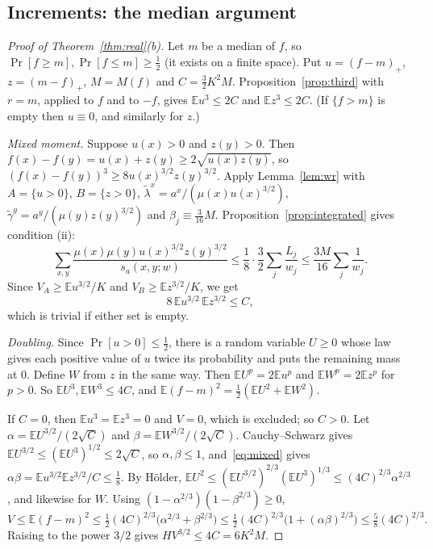 \documentclass[11pt]{article}
\numberwithin{equation}{section}
\theoremstyle{definition}
\theoremstyle{remark}
\newcommand{\E}{\mathbb{E}}
\newcommand{\1}{\mathbf 1}
\begin{document}
\subsection{Increments: the median argument}
\begin{proof}[Proof of Theorem~\ref{thm:real}(b)]
Let $m$ be a median of $f$, so $\Pr[f\ge m],\Pr[f\le m]\ge\frac12$ (it exists on a finite space). Put $u=(f-m)_+$, $z=(m-f)_+$, $M=M(f)$ and $C=\frac32K^2M$. Proposition~\ref{prop:third} with $r=m$, applied to $f$ and to $-f$, gives $\E u^3\le2C$ and $\E z^3\le2C$. (If $\{f>m\}$ is empty then $u\equiv0$, and similarly for $z$.)

\emph{Mixed moment.} Suppose $u(x)>0$ and $z(y)>0$. Then $f(x)-f(y)=u(x)+z(y)\ge2\sqrt{u(x)z(y)}$, so $(f(x)-f(y))^3\ge8u(x)^{3/2}z(y)^{3/2}$. Apply Lemma~\ref{lem:wr} with $A=\{u>0\}$, $B=\{z>0\}$, $\tilde\lambda^x=a^x/(\mu(x)u(x)^{3/2})$, $\tilde\gamma^y=a^y/(\mu(y)z(y)^{3/2})$ and $\beta_j\equiv\frac3{16}M$. Proposition~\ref{prop:integrated} gives condition (ii):
\[
\sum_{x,y}\frac{\mu(x)\mu(y)u(x)^{3/2}z(y)^{3/2}}{s_a(x,y;w)}\le\frac18\cdot\frac32\sum_j\frac{L_j}{w_j}\le\frac{3M}{16}\sum_j\frac1{w_j}.
\]
Since $V_A\ge\E u^{3/2}/K$ and $V_B\ge\E z^{3/2}/K$, we get
\begin{equation}\label{eq:mixed}
8\,\E u^{3/2}\,\E z^{3/2}\le C,
\end{equation}
which is trivial if either set is empty.

\emph{Doubling.} Since $\Pr[u>0]\le\frac12$, there is a random variable $U\ge0$ whose law gives each positive value of $u$ twice its probability and puts the remaining mass at $0$. Define $W$ from $z$ in the same way. Then $\E U^p=2\E u^p$ and $\E W^p=2\E z^p$ for $p>0$. So $\E U^3,\E W^3\le4C$, and $\E(f-m)^2=\frac12(\E U^2+\E W^2)$.

If $C=0$, then $\E u^3=\E z^3=0$ and $V=0$, which is excluded; so $C>0$. Let $\alpha=\E U^{3/2}/(2\sqrt C)$ and $\beta=\E W^{3/2}/(2\sqrt C)$. Cauchy--Schwarz gives $\E U^{3/2}\le(\E U^3)^{1/2}\le2\sqrt C$, so $\alpha,\beta\le1$, and~\eqref{eq:mixed} gives $\alpha\beta=\E u^{3/2}\E z^{3/2}/C\le\frac18$. By H\"older, $\E U^2\le(\E U^{3/2})^{2/3}(\E U^3)^{1/3}\le(4C)^{2/3}\alpha^{2/3}$, and likewise for $W$. Using $(1-\alpha^{2/3})(1-\beta^{2/3})\ge0$,
\[
V\le\E(f-m)^2\le\tfrac12(4C)^{2/3}\bigl(\alpha^{2/3}+\beta^{2/3}\bigr)\le\tfrac12(4C)^{2/3}\bigl(1+(\alpha\beta)^{2/3}\bigr)\le\tfrac58(4C)^{2/3}.
\]
Raising to the power $3/2$ gives $HV^{3/2}\le4C=6K^2M$.
\end{proof}
\end{document}
